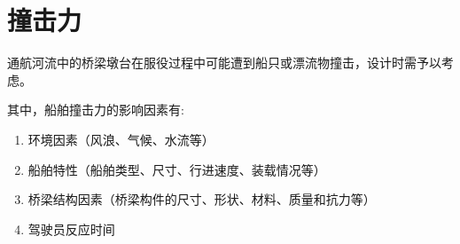 \documentclass[12pt, a4paper, oneside, UTF8]{ctexbook}
\begin{document}
\section{撞击力}
通航河流中的桥梁墩台在服役过程中可能遭到船只或漂流物撞击，设计时需予以考虑。

其中，船舶撞击力的影响因素有:
\begin{enumerate}
    \item 环境因素（风浪、气候、水流等）
    \item 船舶特性（船舶类型、尺寸、行进速度、装载情况等）
    \item 桥梁结构因素（桥梁构件的尺寸、形状、材料、质量和抗力等）
    \item 驾驶员反应时间
\end{enumerate}

\ifx\allfiles\undefined
\end{document}
